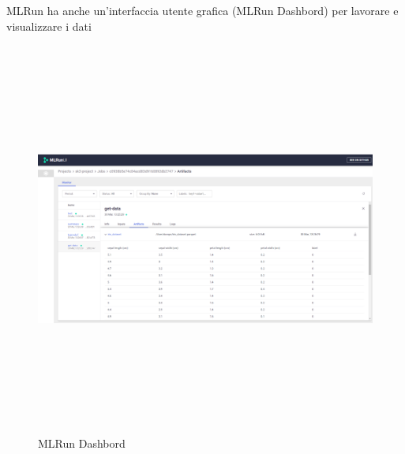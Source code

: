 \documentclass[12pt,a4paper]{report}
\begin{document}
MLRun ha anche un'interfaccia utente grafica (MLRun Dashbord) per lavorare e visualizzare i dati
\begin{figure}[h!]
    \begin{center}
        \includegraphics[width=13cm,height=13cm,keepaspectratio]{MLRun Dashbord}
    \end{center}
    \caption{MLRun Dashbord}
    \label{fig:MLRun-dashbord}
\end{figure}
\end{document}
